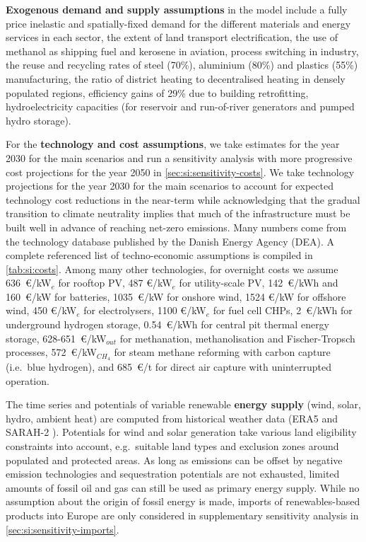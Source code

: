 \textbf{Exogenous demand and supply assumptions} in the model include a fully
price inelastic and spatially-fixed demand for the different materials and
energy services in each sector, the extent of land transport electrification,
the use of methanol as shipping fuel and kerosene in aviation, process switching
in industry, the reuse and recycling rates of steel (70\%), aluminium (80\%) and
plastics (55\%) manufacturing, the ratio of district heating to decentralised
heating in densely populated regions, efficiency gains of 29\% due to building
retrofitting, hydroelectricity capacities (for reservoir and run-of-river
generators and pumped hydro storage).

For the \textbf{technology and cost assumptions}, we take estimates for the year
2030 for the main scenarios and run a sensitivity analysis with more progressive
cost projections for the year 2050 in \cref{sec:si:sensitivity-costs}. We take
technology projections for the year 2030 for the main scenarios to account for
expected technology cost reductions in the near-term while acknowledging that
the gradual transition to climate neutrality implies that much of the
infrastructure must be built well in advance of reaching net-zero emissions.
Many numbers come from the technology database published by the Danish Energy
Agency (DEA). A complete referenced list of techno-economic
assumptions is compiled in \cref{tab:si:costs}. Among many other technologies,
for overnight costs we assume 636~\euro/kW$_e$ for rooftop PV, 487 \euro/kW$_e$
for utility-scale PV, 142~\euro/kWh and 160~\euro/kW for batteries,
1035~\euro/kW for onshore wind, 1524 \euro/kW for offshore wind, 450
\euro/kW$_e$ for electrolysers, 1100 \euro/kW$_e$ for fuel cell CHPs,
2~\euro/kWh for underground hydrogen storage, 0.54~\euro/kWh for central pit
thermal energy storage, 628-651~\euro/kW$_{out}$ for methanation,
methanolisation and Fischer-Tropsch processes, 572~\euro/kW$_{CH_4}$ for steam
methane reforming with carbon capture (i.e.~blue hydrogen), and 685~\euro/t for
direct air capture with uninterrupted operation.

The time series and potentials of variable renewable \textbf{energy supply}
(wind, solar, hydro, ambient heat) are computed from historical weather data
(ERA5 \cite{ecmwf} and SARAH-2 \cite{SARAH}). Potentials for wind and solar
generation take various land eligibility constraints into account, e.g.~suitable
land types and exclusion zones around populated and protected areas. As long as
emissions can be offset by negative emission technologies and sequestration
potentials are not exhausted, limited amounts of fossil oil and gas can still be
used as primary energy supply. While no assumption about the origin of fossil
energy is made, imports of renewables-based products into Europe are only
considered in supplementary sensitivity analysis in \cref{sec:si:sensitivity-imports}.

